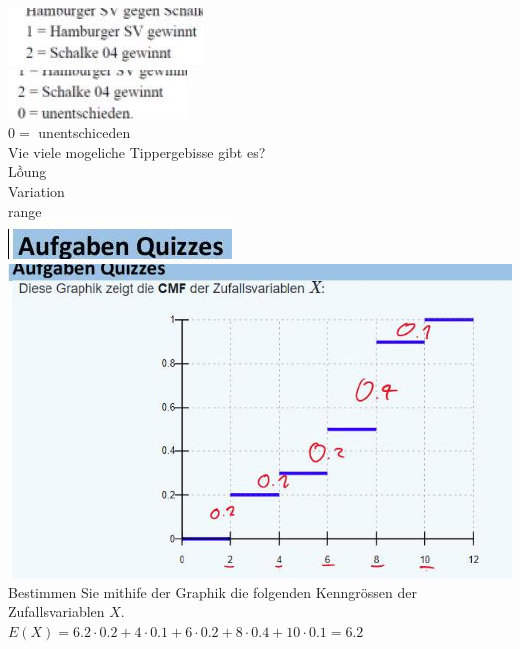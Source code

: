 \documentclass[10pt]{article}
\begin{document}
\begin{itemize}
\includegraphics[max width=\textwidth, center]{2024_12_29_0906b02acf849bda8665g-3(22)}\\
\includegraphics[max width=\textwidth, center]{2024_12_29_0906b02acf849bda8665g-3(1)}\\
$0=$ unentschiceden\\
Vie viele mogeliche Tippergebisse gibt es?\\
Lồung\\
Variation\\
range\\
\includegraphics[max width=\textwidth, center]{2024_12_29_0906b02acf849bda8665g-3(9)}\\
\includegraphics[max width=\textwidth]{2024_12_29_0906b02acf849bda8665g-3(20)}Bestimmen Sie mithife der Graphik die folgenden Kenngrössen der Zufallsvariablen $X$.\\
$E(X)=6.2 \cdot 0.2+4 \cdot 0.1+6 \cdot 0.2+8 \cdot 0.4+10 \cdot 0.1=6.2$
\end{itemize}
\end{document}
